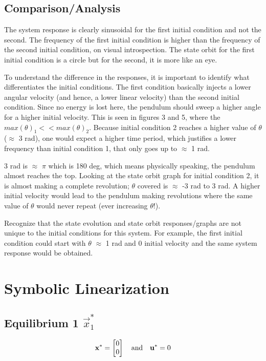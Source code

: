 \documentclass[10pt]{article}
\begin{document}
\subsection{Comparison/Analysis}
    The system response is clearly sinusoidal for the first initial condition and not the second. The frequency of the first initial condition is higher than the frequency of the second initial condition, on visual introspection. The state orbit for the first initial condition is a circle but for the second, it is more like an eye. 
    
    To understand the difference in the responses, it is important to identify what differentiates the initial conditions. The first condition basically injects a lower angular velocity (and hence, a lower linear velocity) than the second initial condition. Since no energy is lost here, the pendulum should sweep a higher angle for a higher initial velocity. This is seen in figures 3 and 5, where the \begin{math}
     max(\theta)_1 << max(\theta)_2
    \end{math}. Because initial condition 2 reaches a higher value of $\theta$ ($\approx$ 3 rad), one would expect a higher time period, which justifies a lower frequency than initial condition 1, that only goes up to $\approx$ 1 rad. 
    
    3 rad is $\approx$ $\pi$ which is 180 deg, which means physically speaking, the pendulum almost reaches the top. Looking at the state orbit graph for initial condition 2, it is almost making a complete revolution; $\theta$ covered is $\approx$ -3 rad to 3 rad. A higher initial velocity would lead to the pendulum making revolutions where the same value of $\theta$ would never repeat (ever increasing $\theta$!). 
    
    Recognize that the state evolution and state orbit responses/graphs are not unique to the initial conditions for this system. For example, the first initial condition could start with $\theta$ $\approx$ 1 rad and 0 initial velocity and the same system response would be obtained. 
    

\section{Symbolic Linearization}

\subsection{Equilibrium 1 $\vec{x}_1^*$}
    \begin{equation*}
         \mathbf{x}^* = \begin{bmatrix} 0\\0 \end{bmatrix}
         \quad
         \text{and}
         \quad
         \mathbf{u}^* = 0
    \end{equation*}
\end{document}
